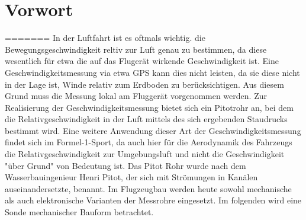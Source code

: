 \section{Vorwort}
=======
In der Luftfahrt ist es oftmals wichtig. die Bewegungsgeschwindigkeit reltiv zur Luft genau zu bestimmen, da diese wesentlich 
für etwa die auf das Flugerät wirkende Geschwindigkeit ist. Eine Geschwindigkeitsmessung via etwa GPS kann dies nicht leisten, 
da sie diese nicht in der Lage ist, Winde relativ zum Erdboden zu berücksichtigen. Aus diesem Grund muss die Messung lokal am 
Fluggerät vorgenommen werden. Zur Realisierung der Geschwindigkeitsmessung bietet sich ein Pitotrohr an, bei dem die 
Relativgeschwindigkeit in der Luft mittels des sich ergebenden Staudrucks bestimmt wird. Eine weitere Anwendung dieser Art der 
Geschwindigkeitsmessung findet sich im Formel-1-Sport, da auch hier für die Aerodynamik des Fahrzeugs die Relativgeschwindigkeit 
zur Umgebungsluft und nicht die Geschwindigkeit "über Grund" von Bedeutung ist. 
Das Pitot Rohr wurde nach dem Wasserbauingenieur Henri Pitot, der sich mit Strömungen in Kanälen auseinandersetzte, benannt.
Im Flugzeugbau werden heute sowohl mechanische als auch elektronische Varianten der Messrohre eingesetzt. Im folgenden wird eine Sonde mechanischer Bauform betrachtet.
